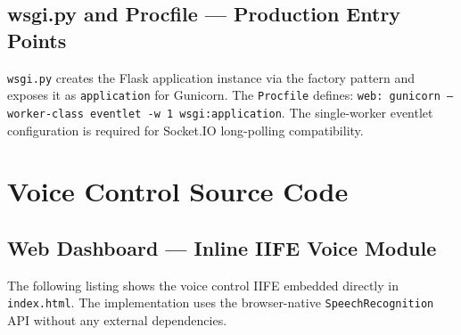 \section{wsgi.py and Procfile --- Production Entry Points}

\texttt{wsgi.py} creates the Flask application instance via the factory
pattern and exposes it as \texttt{application} for Gunicorn. The
\texttt{Procfile} defines: \texttt{web: gunicorn --worker-class eventlet
-w 1 wsgi:application}. The single-worker eventlet configuration is
required for Socket.IO long-polling compatibility.

\chapter{Voice Control Source Code}

\section{Web Dashboard --- Inline IIFE Voice Module}

The following listing shows the voice control IIFE embedded directly in
\texttt{index.html}. The implementation uses the browser-native
\texttt{SpeechRecognition} API without any external dependencies.

